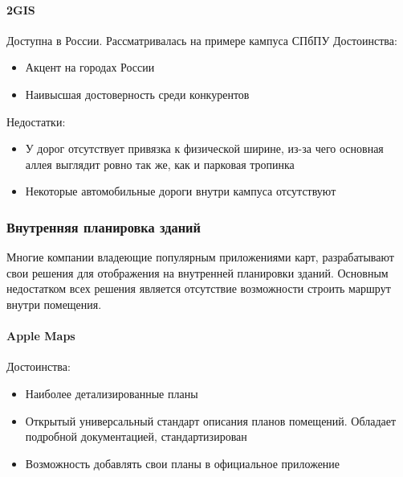 
      \paragraph{2GIS}
        Доступна в России. Рассматривалась на примере кампуса СПбПУ
        \noindent Достоинства:
        \begin{itemize}
          \item Акцент на городах России
          \item Наивысшая достоверность среди конкурентов
        \end{itemize}

        \noindent Недостатки:
        \begin{itemize}
          \item У дорог отсутствует привязка к физической ширине, из-за чего основная аллея выглядит ровно так же, как и парковая тропинка
          \item Некоторые автомобильные дороги внутри кампуса отсутствуют
        \end{itemize}




    \subsubsection{Внутренняя планировка зданий}
      Многие компании владеющие популярным приложениями карт, разрабатывают свои решения для отображения на внутренней планировки зданий. Основным недостатком всех решения является отсутствие возможности строить маршрут внутри помещения.
      \paragraph{Apple Maps}
        \noindent Достоинства:
        \begin{itemize}
          \item Наиболее детализированные планы
          \item Открытый универсальный стандарт описания планов помещений. Обладает подробной документацией, стандартизирован \cite{https://www.ogc.org/standards/requests/202}
          \item Возможность добавлять свои планы в официальное приложение
        \end{itemize}

